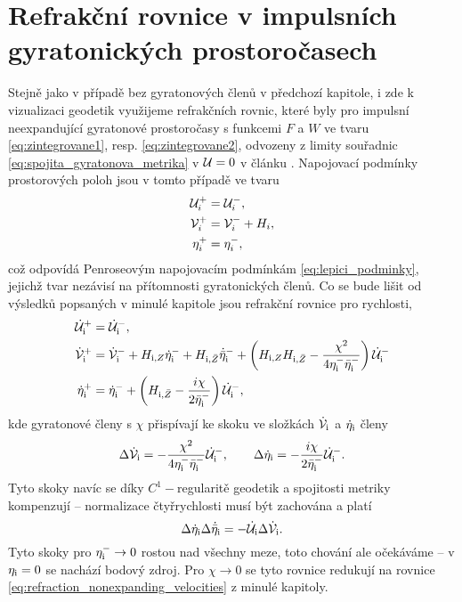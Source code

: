 \section{Refrakční rovnice v impulsních gyratonických prostoročasech}
Stejně jako v případě bez gyratonových členů v předchozí kapitole, i zde k vizualizaci geodetik využijeme refrakčních rovnic,
které byly pro impulsní neexpandující gyratonové prostoročasy s funkcemi $F$ a $W$ ve tvaru
\eqref{eq:zintegrovane1}, resp. \eqref{eq:zintegrovane2}, odvozeny z limity souřadnic \eqref{eq:spojita_gyratonova_metrika}
v $\mathcal{U} = 0$ v článku \cite{Podolsky_2017}.
Napojovací podmínky prostorových poloh jsou v tomto případě ve tvaru
\begin{equation}
    \label{eq:refrakcni_rovnice_gyra_polohy}
    \begin{split}
        \mathcal{U}_{i}^{+} &= \mathcal{U}_{i}^{-}, \\
        \mathcal{V}_{i}^{+} &= \mathcal{V}_{i}^{-} + H_{i}, \\
        \eta_{i}^{+} &= \eta_{i}^{-},
    \end{split}
\end{equation}
což odpovídá Penroseovým napojovacím podmínkám \eqref{eq:lepici_podminky},
jejichž tvar nezávisí na přítomnosti gyratonických členů. Co se bude lišit od
výsledků popsaných v minulé kapitole jsou refrakční rovnice pro rychlosti,
\begin{equation}
    \label{eq:refrakcni_rovnice_gyra_rychlosti}
    \begin{split}
        \dot{\mathcal{U}}_{\mathrm{i}}^{+} &= \dot{\mathcal{U}}_{\mathrm{i}}^{-}, \\
        \dot{\mathcal{V}}_{\mathrm{i}}^{+} &= \dot{\mathcal{V}}_{\mathrm{i}}^{-} + H_{\mathrm{i}, Z} \dot{\eta}_{\mathrm{i}}^{-} + H_{\mathrm{i}, \bar{Z}} \dot{\bar{\eta}}_{\mathrm{i}}^{-} + \left(H_{\mathrm{i}, Z} H_{\mathrm{i}, \bar{Z}} - \frac{\chi^2}{4 \eta_{\mathrm{i}}^{-} \bar{\eta}_{\mathrm{i}}^{-}}\right) \dot{\mathcal{U}}_{\mathrm{i}}^{-} \\
        \dot{\eta}_{\mathrm{i}}^{+} &= \dot{\eta}_{\mathrm{i}}^{-} + \left(H_{\mathrm{i}, \bar{Z}} - \frac{i \chi}{2 \bar{\eta}_{\mathrm{i}}^{-}}\right) \dot{\mathcal{U}}_{\mathrm{i}}^{-},
    \end{split} 
\end{equation}
kde gyratonové členy s $\chi$ přispívají ke skoku ve složkách $\dot{\mathcal{V}}_{\mathrm{i}}$ a $\dot{\eta}_{\mathrm{i}}$ členy
\begin{equation}
    \Delta \dot{\mathcal{V}}_{\mathrm{i}} = -\frac{\chi^2}{4 \eta_{\mathrm{i}}^{-} \bar{\eta}_{\mathrm{i}}^{-}} \dot{\mathcal{U}}_{\mathrm{i}}^{-}, ~~~~~~ \Delta \dot{\eta}_{\mathrm{i}} = -\frac{i \chi}{2 \bar{\eta}_{\mathrm{i}}^{-}} \dot{\mathcal{U}}_{\mathrm{i}}^{-}.
\end{equation}
Tyto skoky navíc se díky $C^1-$regularitě geodetik a spojitosti metriky kompenzují -- normalizace čtyřrychlosti musí být zachována a platí
\begin{equation}
    \Delta \dot{\eta}_{\mathrm{i}} \Delta \dot{\bar{\eta}}_{\mathrm{i}} = - \dot{\mathcal{U}}_{\mathrm{i}} \Delta \dot{\mathcal{V}}_{\mathrm{i}}.
\end{equation}
Tyto skoky pro $\eta_{\mathrm{i}}^{-} \to 0$ rostou nad všechny meze, toto chování ale očekáváme -- v $\eta_{\mathrm{i}} = 0$ se nachází bodový zdroj.
Pro $\chi \to 0$ se tyto rovnice redukují na rovnice \eqref{eq:refraction_nonexpanding_velocities} z minulé kapitoly.

